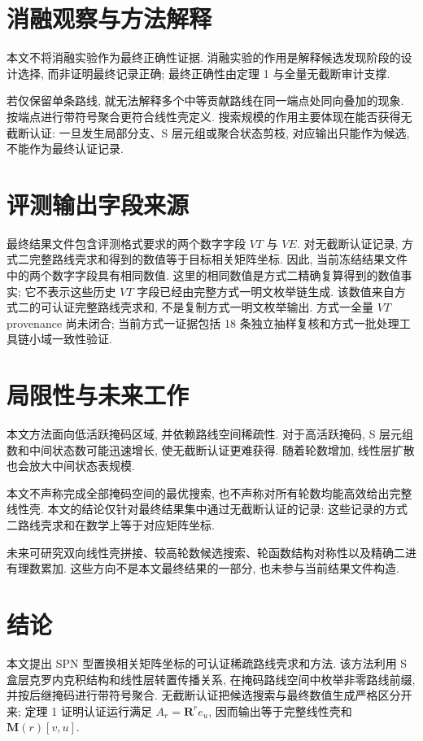 \documentclass[UTF8,a4paper,zihao=-4,fontset=fandol]{ctexart}
\numberwithin{equation}{section}
\theoremstyle{definition}
\theoremstyle{plain}
\theoremstyle{remark}
\begin{document}
\section{消融观察与方法解释}

本文不将消融实验作为最终正确性证据. 消融实验的作用是解释候选发现阶段的设计选择, 而非证明最终记录正确; 最终正确性由定理 1 与全量无截断审计支撑.

若仅保留单条路线, 就无法解释多个中等贡献路线在同一端点处同向叠加的现象. 按端点进行带符号聚合更符合线性壳定义. 搜索规模的作用主要体现在能否获得无截断认证: 一旦发生局部分支、S 层元组或聚合状态剪枝, 对应输出只能作为候选, 不能作为最终认证记录.

\section{评测输出字段来源}

最终结果文件包含评测格式要求的两个数字字段 $VT$ 与 $VE$. 对无截断认证记录, 方式二完整路线壳求和得到的数值等于目标相关矩阵坐标. 因此, 当前冻结结果文件中的两个数字字段具有相同数值. 这里的相同数值是方式二精确复算得到的数值事实; 它不表示这些历史 $VT$ 字段已经由完整方式一明文枚举链生成. 该数值来自方式二的可认证完整路线壳求和, 不是复制方式一明文枚举输出. 方式一全量 $VT$ provenance 尚未闭合; 当前方式一证据包括 18 条独立抽样复核和方式一批处理工具链小域一致性验证.

\section{局限性与未来工作}

本文方法面向低活跃掩码区域, 并依赖路线空间稀疏性. 对于高活跃掩码, S 层元组数和中间状态数可能迅速增长, 使无截断认证更难获得. 随着轮数增加, 线性层扩散也会放大中间状态表规模.

本文不声称完成全部掩码空间的最优搜索, 也不声称对所有轮数均能高效给出完整线性壳. 本文的结论仅针对最终结果集中通过无截断认证的记录: 这些记录的方式二路线壳求和在数学上等于对应矩阵坐标.

未来可研究双向线性壳拼接、较高轮数候选搜索、轮函数结构对称性以及精确二进有理数累加. 这些方向不是本文最终结果的一部分, 也未参与当前结果文件构造.

\section{结论}

本文提出 SPN 型置换相关矩阵坐标的可认证稀疏路线壳求和方法. 该方法利用 S 盒层克罗内克积结构和线性层转置传播关系, 在掩码路线空间中枚举非零路线前缀, 并按后继掩码进行带符号聚合. 无截断认证把候选搜索与最终数值生成严格区分开来; 定理 1 证明认证运行满足 $A_r=\bm{R}^{r}e_u$, 因而输出等于完整线性壳和 $\bm{M}(r)[v,u]$.
\end{document}
